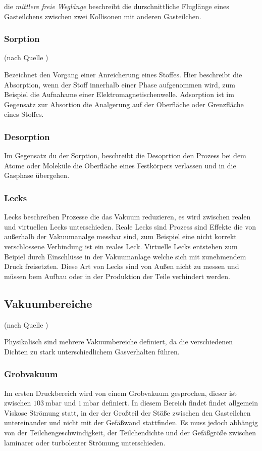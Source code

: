 			die \textit{mittlere freie Weglänge} beschreibt die durschnittliche Fluglänge eines Gasteilchens zwischen zwei Kollisonen mit anderen Gasteilchen.

		\subsubsection{Sorption}(nach Quelle \cite{wiki:sor})
			
			Bezeichnet den Vorgang einer Anreicherung eines Stoffes. 
			Hier beschreibt die Absorption, wenn der Stoff innerhalb einer Phase aufgenommen wird, zum Beispiel die Aufnahame einer Elektromagnetischenwelle.
			Adsorption ist im Gegensatz zur Absortion die Analgerung auf der Oberfläche oder Grenzfläche eines Stoffes.

		\subsubsection{Desorption}

			Im Gegensatz du der Sorption, beschreibt die Desoprtion den Prozess bei dem Atome oder Moleküle die Oberfläche eines Festkörpers verlassen und in die Gasphase übergehen.
		
		\subsubsection{Lecks}

			Lecks beschreiben Prozesse die das Vakuum reduzieren, es wird zwischen realen und virtuellen Lecks unterschieden.
			Reale Lecks sind Prozess sind Effekte die von außerhalb der Vakuumanalge messbar sind, zum Beispiel eine nicht korrekt verschlossene Verbindung ist ein reales Leck.
			Virtuelle Lecks entstehen zum Beipiel durch Einschlüsse in der Vakuumanlage welche sich mit zunehmendem Druck freisetzten.
			Diese Art von Lecks sind von Außen nicht zu messen und müssen bem Aufbau oder in der Produktion der Teile verhindert werden.  		

	\subsection{Vakuumbereiche}(nach Quelle \cite{pfeiffer:grund})

		Physikalisch sind mehrere Vakuumbereiche definiert, da die verschiedenen Dichten zu stark unterschiedlichem Gasverhalten führen. 

		\subsubsection{Grobvakuum}
			Im ersten Druckbereich wird von einem Grobvakuum gesprochen, dieser ist zwischen $\SI{103}{\milli\bar}$ und $\SI{1}{\milli\bar}$ definiert.
			In diesem Bereich findet findet allgemein Viskose Strömung statt, in der der Großteil der Stöße zwischen den Gasteilchen untereinander und nicht mit der Gefäßwand stattfinden.
			Es muss jedoch abhängig von der Teilchengeschwindigkeit, der Teilchendichte und der Gefäßgröße zwischen laminarer oder turbolenter Strömung unterschieden. 

